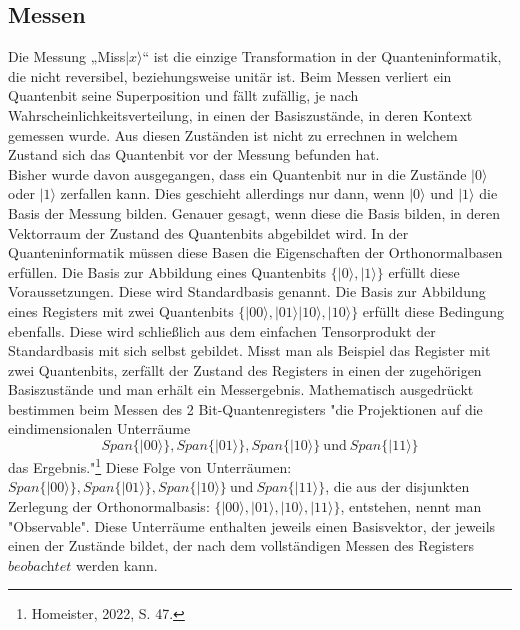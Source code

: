 \subsection{Messen}

Die Messung „Miss$\left|x\right.\rangle$“ ist die einzige Transformation in der Quanteninformatik, die nicht reversibel, beziehungsweise unitär ist. Beim Messen verliert ein Quantenbit seine Superposition und fällt zufällig, je nach Wahrscheinlichkeitsverteilung, in einen der Basiszustände, in deren Kontext gemessen wurde. Aus diesen Zuständen ist nicht zu errechnen in welchem Zustand sich das Quantenbit vor der Messung befunden hat. \\
Bisher wurde davon ausgegangen, dass ein Quantenbit nur in die Zustände $\left|0\right.\rangle$ oder $\left|1\right.\rangle$ zerfallen kann. Dies geschieht allerdings nur dann, wenn $\left|0\right.\rangle$ und $\left|1\right.\rangle$ die Basis der Messung bilden. Genauer gesagt, wenn diese die Basis bilden, in deren Vektorraum der Zustand des Quantenbits abgebildet wird. 
In der Quanteninformatik müssen diese Basen die Eigenschaften der Orthonormalbasen erfüllen. Die Basis zur Abbildung eines Quantenbits $\{\left|0\right.\rangle,\left|1\right.\rangle\}$ erfüllt diese Voraussetzungen. Diese wird Standardbasis genannt. Die Basis zur Abbildung eines Registers mit zwei Quantenbits $\{\left|00\right.\rangle,\left|01\right.\rangle\left|10\right.\rangle,\left|10\right.\rangle\}$ erfüllt diese Bedingung ebenfalls. Diese wird schließlich aus dem einfachen Tensorprodukt der Standardbasis mit sich selbst gebildet. 
Misst man als Beispiel das Register mit zwei Quantenbits, zerfällt der Zustand des Registers in einen der zugehörigen Basiszustände und man erhält ein Messergebnis.
Mathematisch ausgedrückt bestimmen beim Messen des 2 Bit-Quantenregisters "die Projektionen auf die eindimensionalen Unterräume 
$$Span\{\left|00\right.\rangle\},Span\{\left|01\right.\rangle\},Span\{\left|10\right.\rangle\}\ \text{und}\ Span\{\left|11\right.\rangle\}$$
das Ergebnis."\footnote{Homeister, 2022, S. 47.}
Diese Folge von Unterräumen: $Span\{\left|00\right.\rangle\},Span\{\left|01\right.\rangle\},Span\{\left|10\right.\rangle\}\ \text{und}\ Span\{\left|11\right.\rangle\}$, die aus der disjunkten Zerlegung der Orthonormalbasis: $\{\left|00\right.\rangle,\left|01\right.\rangle,\left|10\right.\rangle,\left|11\right.\rangle\}$, entstehen, nennt man "Observable".
Diese Unterräume enthalten jeweils einen Basisvektor, der jeweils einen der Zustände bildet, der nach dem vollständigen Messen des Registers $\textit{beobachtet}$ werden kann.\\

